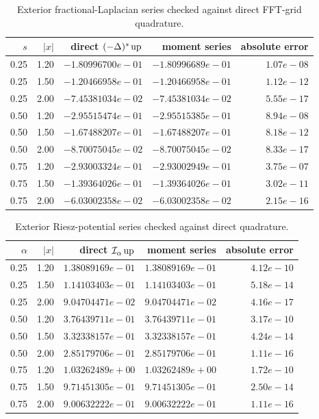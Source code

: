 \begin{table}[htbp]
\centering\small
\begin{tabular}{@{}rrrrr@{}}
\toprule
$s$ & $|x|$ & direct $(-\Delta)^s\operatorname{up}$ & moment series & absolute error\\
\midrule
0.25 & 1.20 & $-1.80996700e-01$ & $-1.80996689e-01$ & $1.07e-08$\\
0.25 & 1.50 & $-1.20466958e-01$ & $-1.20466958e-01$ & $1.12e-12$\\
0.25 & 2.00 & $-7.45381034e-02$ & $-7.45381034e-02$ & $5.55e-17$\\
0.50 & 1.20 & $-2.95515474e-01$ & $-2.95515385e-01$ & $8.94e-08$\\
0.50 & 1.50 & $-1.67488207e-01$ & $-1.67488207e-01$ & $8.18e-12$\\
0.50 & 2.00 & $-8.70075045e-02$ & $-8.70075045e-02$ & $8.33e-17$\\
0.75 & 1.20 & $-2.93003324e-01$ & $-2.93002949e-01$ & $3.75e-07$\\
0.75 & 1.50 & $-1.39364026e-01$ & $-1.39364026e-01$ & $3.02e-11$\\
0.75 & 2.00 & $-6.03002358e-02$ & $-6.03002358e-02$ & $2.15e-16$\\
\bottomrule\end{tabular}
\caption{Exterior fractional-Laplacian series checked against direct FFT-grid quadrature.}
\label{tab:fraclap-check}
\end{table}
\begin{table}[htbp]
\centering\small
\begin{tabular}{@{}rrrrr@{}}
\toprule
$\alpha$ & $|x|$ & direct $\mathcal I_\alpha\operatorname{up}$ & moment series & absolute error\\
\midrule
0.25 & 1.20 & $1.38089169e-01$ & $1.38089169e-01$ & $4.12e-10$\\
0.25 & 1.50 & $1.14103403e-01$ & $1.14103403e-01$ & $5.18e-14$\\
0.25 & 2.00 & $9.04704471e-02$ & $9.04704471e-02$ & $4.16e-17$\\
0.50 & 1.20 & $3.76439711e-01$ & $3.76439711e-01$ & $3.17e-10$\\
0.50 & 1.50 & $3.32338157e-01$ & $3.32338157e-01$ & $4.24e-14$\\
0.50 & 2.00 & $2.85179706e-01$ & $2.85179706e-01$ & $1.11e-16$\\
0.75 & 1.20 & $1.03262489e+00$ & $1.03262489e+00$ & $1.72e-10$\\
0.75 & 1.50 & $9.71451305e-01$ & $9.71451305e-01$ & $2.50e-14$\\
0.75 & 2.00 & $9.00632222e-01$ & $9.00632222e-01$ & $1.11e-16$\\
\bottomrule\end{tabular}
\caption{Exterior Riesz-potential series checked against direct quadrature.}
\label{tab:riesz-check}
\end{table}
